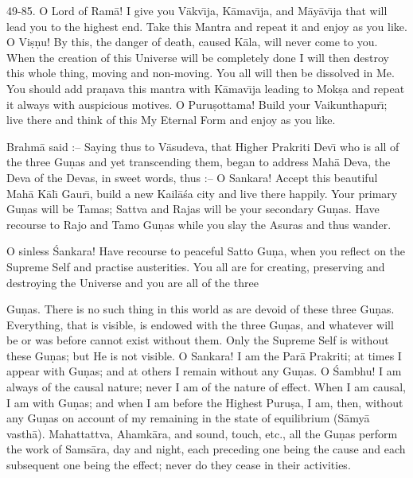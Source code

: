 49-85. O Lord of Ram\=a! I give you V\=akv\={\i}ja, K\=amav\={\i}ja, and M\=ay\=av\={\i}ja that will lead you to the highest end. Take this Mantra and repeat it and enjoy as you like. O Vi\d{s}\d{n}u! By this, the danger of death, caused K\=ala, will never come to you. When the creation of this Universe will be completely done I will then destroy this whole thing, moving and non-moving. You all will then be dissolved in Me. You should add pra\d{n}ava this mantra with K\=amav\={\i}ja leading to Mok\d{s}a and repeat it always with auspicious motives. O Puru\d{s}ottama! Build your Vaikunthapur\={\i}; live there and think of this My Eternal Form and enjoy as you like.

Brahm\=a said :-- Saying thus to V\=asudeva, that Higher Prakriti Dev\={\i} who is all of the three Gu\d{n}as and yet transcending them, began to address Mah\=a Deva, the Deva of the Devas, in sweet words, thus :-- O Sankara! Accept this beautiful Mah\=a K\=al\={\i} Gaur\={\i}, build a new Kail\=a\'sa city and live there happily. Your primary Gu\d{n}as will be Tamas; Sattva and Rajas will be your secondary Gu\d{n}as. Have recourse to Rajo and Tamo Gu\d{n}as while you slay the Asuras and thus wander.

O sinless \'Sankara! Have recourse to peaceful Satto Gu\d{n}a, when you reflect on the Supreme Self and practise austerities. You all are for creating, preserving and destroying the Universe and you are all of the three

Gu\d{n}as. There is no such thing in this world as are devoid of these three Gu\d{n}as. Everything, that is visible, is endowed with the three Gu\d{n}as, and whatever will be or was before cannot exist without them. Only the Supreme Self is without these Gu\d{n}as; but He is not visible. O Sankara! I am the Par\=a Prakriti; at times I appear with Gu\d{n}as; and at others I remain without any Gu\d{n}as. O \'Sambhu! I am always of the causal nature; never I am of the nature of effect. When I am causal, I am with Gu\d{n}as; and when I am before the Highest Puru\d{s}a, I am, then, without any Gu\d{n}as on account of my remaining in the state of equilibrium (S\=amy\=a vasth\=a). Mahattattva, Ahamk\=ara, and sound, touch, etc., all the Gu\d{n}as perform the work of Sams\=ara, day and night, each preceding one being the cause and each subsequent one being the effect; never do they cease in their activities.

